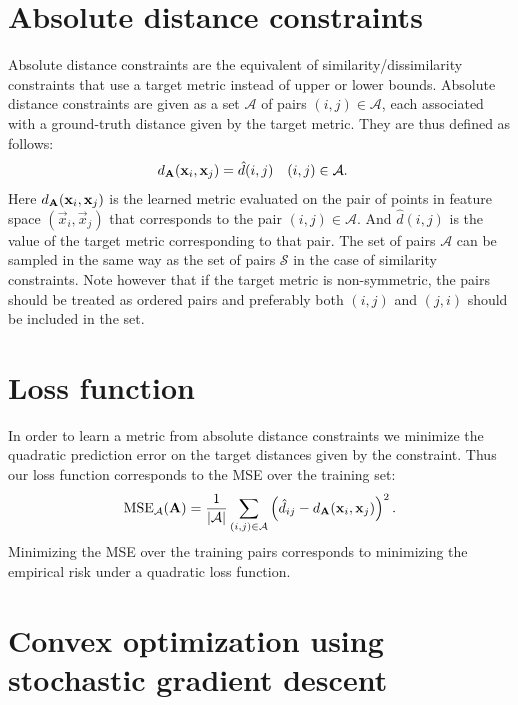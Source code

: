 \section{Absolute distance constraints}
Absolute distance constraints are the equivalent of similarity/dissimilarity constraints that use a target metric instead of upper or lower bounds.
Absolute distance constraints are given as a set $\mathcal{A}$ of pairs $(i,j) \in \mathcal{A}$, each associated with a ground-truth distance given by the target metric. They are thus defined as follows:
\begin{align}
d_{\mathbf{A}}(\mathbf{x}_i, \mathbf{x}_j) &= \hat{d}(i,j) & (i, j) &\in \mathcal{A}.
\end{align}
Here $d_{\mathbf{A}}(\mathbf{x}_i, \mathbf{x}_j)$ is the learned metric evaluated on the pair of points in feature space $(\vec{x}_i, \vec{x}_j)$ that corresponds to the pair $(i,j) \in \mathcal{A}$.
And $\hat{d}(i,j)$ is the value of the target metric corresponding to that pair.
The set of pairs $\mathcal{A}$ can be sampled in the same way as the set of pairs $\mathcal{S}$ in the case of similarity constraints.
Note however that if the target metric is non-symmetric, the pairs should be treated as ordered pairs and preferably both $(i,j)$ and $(j,i)$ should be included in the set.



\section{Loss function}

In order to learn a metric from absolute distance constraints we minimize the quadratic prediction error on the target distances given by the constraint. Thus our loss function corresponds to the \acf{MSE} over the training set:
\begin{equation}
\text{MSE}_\mathcal{A}(\mathbf{A}) = \frac{1}{|\mathcal{A}|}\sum_{(i,j) \in \mathcal{A}} \left( \hat{d}_{ij} - d_{\mathbf{A}}(\mathbf{x}_i, \mathbf{x}_j) \right)^2.
\label{eq:mse}
\end{equation}
Minimizing the \ac{MSE} over the training pairs corresponds to minimizing the empirical risk under a quadratic loss function.


\section{Convex optimization using stochastic gradient descent}

